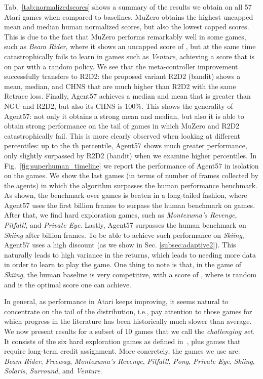 \documentclass{article}
\begin{document}
Tab.~\ref{tab:normalizedscores} shows a summary of the results we obtain on all 57 Atari games when compared to baselines. MuZero obtains the highest uncapped mean and median human normalized scores, but also the lowest capped scores. This is due to the fact that MuZero performs remarkably well in some games, such as \textit{Beam Rider}, where it shows an uncapped score of , but at the same time catastrophically fails to learn in games such as \textit{Venture}, achieving a score that is on par with a random policy. We see that the meta-controller improvement successfully transfers to R2D2: the proposed variant R2D2 (bandit) shows a mean, median, and CHNS that are much higher than R2D2 with the same Retrace loss. Finally, Agent57 achieves a median and mean that is greater than NGU and R2D2, but also its CHNS is 100\%. This shows the generality of Agent57: not only it obtains a strong mean and median, but also it is able to obtain strong performance on the tail of games in which MuZero and R2D2 catastrophically fail. This is more clearly observed when looking at different percentiles: up to the th percentile, Agent57 shows much greater performance, only slightly surpassed by R2D2 (bandit) when we examine higher percentiles.
In Fig.~\ref{fig:superhuman_timeline} we report the performance of Agent57 in isolation on the  games. We show the last  games (in terms of number of frames collected by the agents) in which the algorithm surpasses the human performance benchmark. As shown, the benchmark over games is beaten in a long-tailed fashion, where Agent57 uses the first  billion frames to surpass the human benchmark on  games. After that, we find hard exploration games, such as \textit{Montezuma's Revenge}, \textit{Pitfall!}, and \textit{Private Eye}. Lastly, Agent57 surpasses the human benchmark on \textit{Skiing} after  billion frames.
To be able to achieve such performance on \textit{Skiing}, Agent57 uses a high discount (as we show in Sec. \ref{subsec:adaptive2}). This naturally leads to high variance in the returns, which leads to needing more data in order to learn to play the game. One thing to note is that, in the game of \textit{Skiing}, the human baseline is very competitive, with a score of  , where  is random and  is the optimal score one can achieve.

In general, as performance in Atari keeps improving, it seems natural to concentrate on the tail of the distribution, i.e., pay attention to those games for which progress in the literature has been historically much slower than average.
We now present results for a subset of 10 games that we call the \emph{challenging set}. It consists of the six hard exploration games as defined in~\cite{bellemare2016unifying}, plus games that require long-term credit assignment. More concretely, the games we use are: \textit{Beam Rider}, \textit{Freeway}, \textit{Montezuma's Revenge}, \textit{Pitfall!}, \textit{Pong}, \textit{Private Eye}, \textit{Skiing}, \textit{Solaris}, \textit{Surround}, and \textit{Venture}. 
\end{document}
